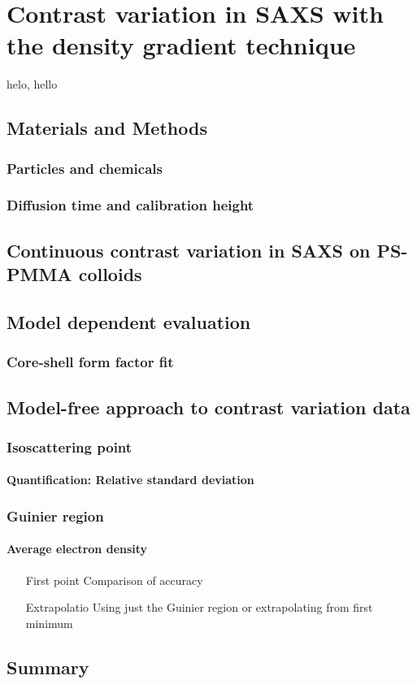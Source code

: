 \chapter{Contrast variation in SAXS with the density gradient technique}
\label{chap:density_gradient_SAXS}
helo, hello
\section{Materials and Methods}
\blindtext[1]

\subsection{Particles and chemicals}
\subsection{Diffusion time and calibration height}

\section{Continuous contrast variation in SAXS on PS-PMMA colloids}

\section{Model dependent evaluation}
\subsection{Core-shell form factor fit}

\section{Model-free approach to contrast variation data}
\subsection{Isoscattering point}
\subsubsection{Quantification: Relative standard deviation}
\subsection{Guinier region}
\subsubsection{Average electron density}
\begin{itemize}
	\item [First point] Comparison of accuracy
	\item [Extrapolatio] Using just the Guinier region or extrapolating from first minimum
\end{itemize}

\section{Summary}

